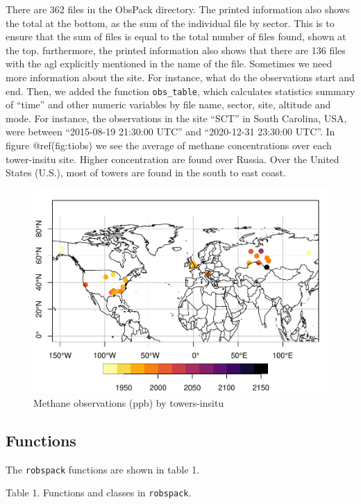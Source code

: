 \documentclass[preprint, 3p,
authoryear]{elsarticle} %
\begin{document}
There are 362 files in the ObsPack directory. The printed information
also shows the total at the bottom, as the sum of the individual file by
sector. This is to ensure that the sum of files is equal to the total
number of files found, shown at the top. furthermore, the printed
information also shows that there are 136 files with the agl explicitly
mentioned in the name of the file. Sometimes we need more information
about the site. For instance, what do the observations start and end.
Then, we added the function \texttt{obs\_table}, which calculates
statistics summary of ``time'' and other numeric variables by file name,
sector, site, altitude and mode. For instance, the observations in the
site ``SCT'' in South Carolina, USA, were between ``2015-08-19 21:30:00
UTC'' and ``2020-12-31 23:30:00 UTC''. In figure @ref(fig:tiobs) we see
the average of methane concentrations over each tower-insitu site.
Higher concentration are found over Russia. Over the United States
(U.S.), most of towers are found in the south to east coast.

\begin{figure}
\centering
\includegraphics{paper_elsevier_files/figure-latex/tiobs-1.pdf}
\caption{Methane observations (ppb) by towers-insitu}
\end{figure}

\hypertarget{functions}{%
\subsection{Functions}\label{functions}}

The \texttt{robspack} functions are shown in table 1.

Table 1. Functions and classes in \texttt{robspack}.
\end{document}
